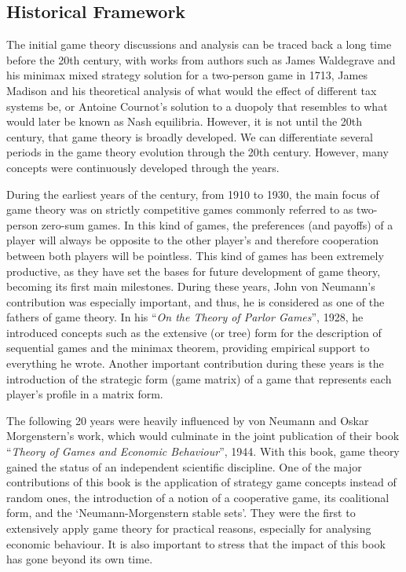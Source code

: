 \documentclass[]{report}
\begin{document}
\subsection{Historical Framework}

The initial game theory discussions and analysis can be traced back a long time before the 20th century, with works from authors such as James Waldegrave and his minimax mixed strategy solution for a two-person game in 1713, James Madison and his theoretical analysis of what would the effect of different tax systems be, or Antoine Cournot’s solution to a duopoly that resembles to what would later be known as Nash equilibria. However, it is not until the 20th century, that game theory is broadly developed. We can differentiate several periods in the game theory evolution through the 20th century. However, many concepts were continuously developed through the years.

During the earliest years of the century, from 1910 to 1930, the main focus of game theory was on  strictly competitive games commonly referred to as two-person zero-sum games. In this kind of games, the preferences (and payoffs) of a player will always be opposite to the other player’s and therefore cooperation between both players will be pointless. This kind of games has been extremely productive, as they have set the bases for future development of game theory, becoming its first main milestones. During these years, John von Neumann’s contribution was especially important, and thus, he is considered as one of the fathers of game theory.  In his “\textit{On the Theory of Parlor Games}”, 1928, he introduced concepts such as the extensive (or tree) form for the description of sequential games and the minimax theorem, providing empirical support to everything he wrote. Another important contribution during these years is the introduction of the strategic form (game matrix) of a game that represents each player’s profile in a matrix form.


The following 20 years were heavily influenced by von Neumann and Oskar Morgenstern’s work, which would culminate in the joint publication of their book “\textit{Theory of Games and Economic Behaviour}”, 1944.  With this book, game theory gained the status of an independent scientific discipline. One of the major contributions of this book is the application of strategy game concepts instead of random ones, the introduction of a notion of a cooperative game, its coalitional form, and the ‘Neumann-Morgenstern stable sets’. They were the first to extensively apply game theory for practical reasons, especially for analysing economic behaviour. It is also important to stress that the impact of this book has gone beyond its own time.  
\end{document}
